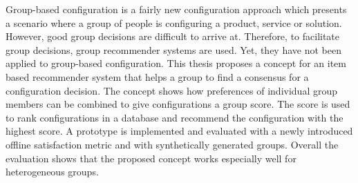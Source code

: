 \Abstract

Group-based configuration is a fairly new configuration approach which presents a scenario where a group of people is configuring a product, service or solution. However, good group decisions are difficult to arrive at. Therefore, to facilitate group decisions, group recommender systems are used. Yet, they have not been applied to group-based configuration. This thesis proposes a concept for an item based recommender system that helps a group to find a consensus for a configuration decision. The concept shows how preferences of individual group members can be combined to give configurations a group score. The score is used to rank configurations in a database and recommend the configuration with the highest score.
A prototype is implemented and evaluated with a newly introduced offline satisfaction metric and with synthetically generated groups. Overall the evaluation shows that the proposed concept works especially well for heterogeneous groups. 